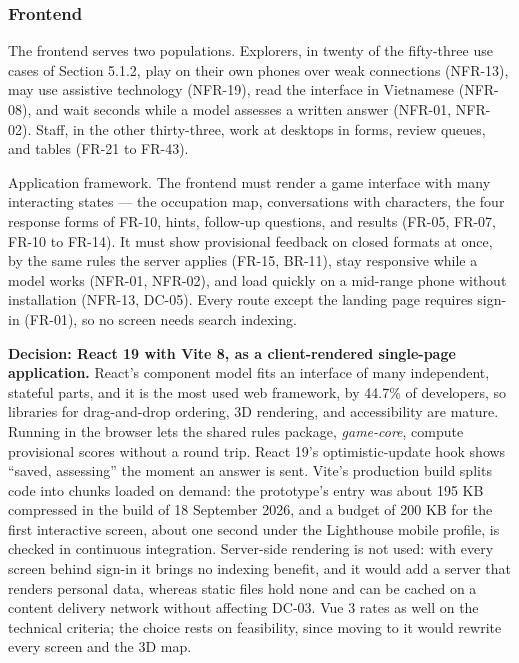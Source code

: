 \subsubsection{Frontend}

The frontend serves two populations. Explorers, in twenty of the fifty-three use cases of Section 5.1.2, play on their own phones over weak connections (NFR-13), may use assistive technology (NFR-19), read the interface in Vietnamese (NFR-08), and wait seconds while a model assesses a written answer (NFR-01, NFR-02). Staff, in the other thirty-\allowbreak{}three, work at desktops in forms, review queues, and tables (FR-21 to FR-43).

Application framework. The frontend must render a game interface with many interacting states --- the occupation map, conversations with characters, the four response forms of FR-10, hints, follow-up questions, and results (FR-05, FR-07, FR-10 to FR-14). It must show provisional feedback on closed formats at once, by the same rules the server applies (FR-15, BR-11), stay responsive while a model works (NFR-01, NFR-02), and load quickly on a mid-range phone without installation (NFR-13, DC-05). Every route except the landing page requires sign-in (FR-01), so no screen needs search indexing.

\textbf{Decision: React 19 with Vite 8, as a client-\allowbreak{}rendered single-page application.\allowbreak{}} React's component model fits an interface of many independent, stateful parts, and it is the most used web framework, by 44.7\% of developers\cite{r134}, so libraries for drag-\allowbreak{}and-\allowbreak{}drop ordering, 3D rendering, and accessibility are mature. Running in the browser lets the shared rules package, \textit{game-\allowbreak{}core}, compute provisional scores without a round trip. React 19's optimistic-\allowbreak{}update hook shows ``saved, assessing'' the moment an answer is sent\cite{r135}. Vite's production build splits code into chunks loaded on demand\cite{r136}: the prototype's entry was about 195 KB compressed in the build of 18 September 2026, and a budget of 200 KB for the first interactive screen, about one second under the Lighthouse mobile profile\cite{r137}, is checked in continuous integration. Server-side rendering is not used: with every screen behind sign-in it brings no indexing benefit, and it would add a server that renders personal data, whereas static files hold none and can be cached on a content delivery network without affecting DC-03. Vue 3 rates as well on the technical criteria; the choice rests on feasibility, since moving to it would rewrite every screen and the 3D map.

